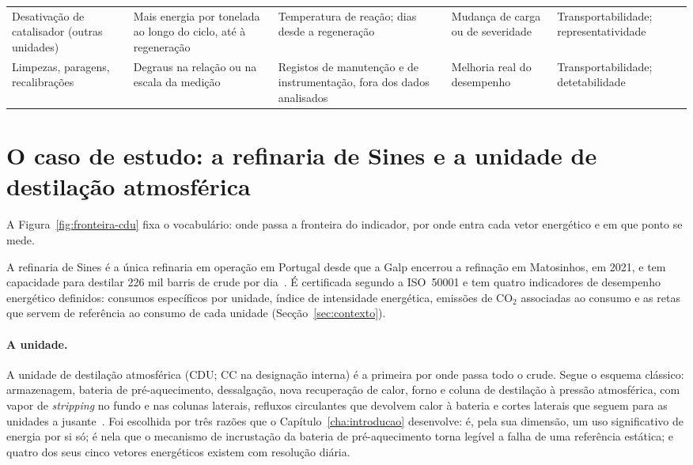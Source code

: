 {\begin{xltabular}{\textwidth}{@{}>{\raggedright\arraybackslash}p{2.3cm} >{\raggedright\arraybackslash}X >{\raggedright\arraybackslash}X >{\raggedright\arraybackslash}X >{\raggedright\arraybackslash}p{2.1cm}@{}}
    \addlinespace
    Desativação de catalisador (outras unidades) & Mais energia por tonelada ao longo do ciclo, até à regeneração & Temperatura de reação; dias desde a regeneração & Mudança de carga ou de severidade & Transportabilidade; representatividade \\
    \addlinespace
    Limpezas, paragens, recalibrações & Degraus na relação ou na escala da medição & Registos de manutenção e de instrumentação, fora dos dados analisados & Melhoria real do desempenho & Transportabilidade; detetabilidade \\
\end{xltabular}
}

\section{O caso de estudo: a refinaria de Sines e a unidade de destilação atmosférica}
\label{sec:caso-estudo}
A Figura~\ref{fig:fronteira-cdu} fixa o vocabulário: onde passa a fronteira do indicador, por onde entra cada vetor energético e em que ponto se mede.



A refinaria de Sines é a única refinaria em operação em Portugal desde que a
Galp encerrou a refinação em Matosinhos, em 2021, e tem capacidade para
destilar 226 mil barris de crude por dia~\cite{Galp2026Industrial}. É certificada
segundo a ISO~50001 e tem quatro indicadores de desempenho energético
definidos: consumos específicos por unidade, índice de intensidade
energética, emissões de CO$_2$ associadas ao consumo e as retas que servem
de referência ao consumo de cada unidade (Secção~\ref{sec:contexto}).

\paragraph{A unidade.} A unidade de destilação atmosférica (CDU; CC na
designação interna) é a primeira por onde passa todo o crude. Segue o
esquema clássico: armazenagem, bateria de pré-aquecimento, dessalgação,
nova recuperação de calor, forno e coluna de destilação à pressão
atmosférica, com vapor de \emph{stripping} no fundo e nas colunas laterais,
refluxos circulantes que devolvem calor à bateria e cortes laterais que
seguem para as unidades a jusante~\cite{Gary2007}. Foi escolhida por três
razões que o Capítulo~\ref{cha:introducao} desenvolve: é, pela sua dimensão,
um uso significativo de energia por si só; é nela que o mecanismo de
incrustação da bateria de pré-aquecimento torna legível a falha de uma
referência estática; e quatro dos seus cinco vetores energéticos existem
com resolução diária.

